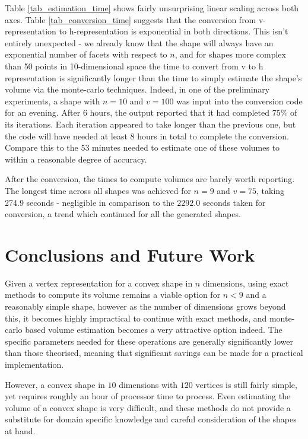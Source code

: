 Table \ref{tab_estimation_time} shows fairly unsurprising linear scaling across both axes. Table \ref{tab_conversion_time} suggests that the conversion from v-representation to h-representation is exponential in both directions. This isn't entirely unexpected - we already know that the shape will always have an exponential number of facets with respect to $n$, and for shapes more complex than 50 points in 10-dimensional space the time to convert from v to h representation is significantly longer than the time to simply estimate the shape's volume via the monte-carlo techniques. Indeed, in one of the preliminary experiments, a shape with $n=10$ and $v=100$ was input into the conversion code for an evening. After 6 hours, the output reported that it had completed $75\%$ of its iterations. Each iteration appeared to take longer than the previous one, but the code will have needed at least 8 hours in total to complete the conversion. Compare this to the 53 minutes needed to estimate one of these volumes to within a reasonable degree of accuracy.

After the conversion, the times to compute volumes are barely worth reporting. The longest time across all shapes was achieved for $n=9$ and $v = 75$, taking 274.9 seconds - negligible in comparison to the $2292.0$ seconds taken for conversion, a trend which continued for all the generated shapes.

\section{Conclusions and Future Work}

Given a vertex representation for a convex shape in $n$ dimensions, using exact methods to compute its volume remains a viable option for $n<9$ and a reasonably simple shape, however as the number of dimensions grows beyond this, it becomes highly impractical to continue with exact methods, and monte-carlo based volume estimation becomes a very attractive option indeed. The specific parameters needed for these operations are generally significantly lower than those theorised, meaning that significant savings can be made for a practical implementation.

However, a convex shape in $10$ dimensions with $120$ vertices is still fairly simple, yet requires roughly an hour of processor time to process. Even estimating the volume of a convex shape is very difficult, and these methods do not provide a substitute for domain specific knowledge and careful consideration of the shapes at hand.

